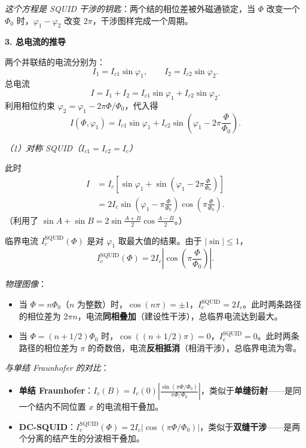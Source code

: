 \begin{insightbox}[举一反三与物理直觉]
\textit{这个方程是 SQUID 干涉的钥匙}：两个结的相位差被外磁通锁定，当 $\Phi$ 改变一个 $\Phi_0$ 时，$\varphi_1 - \varphi_2$ 改变 $2\pi$，干涉图样完成一个周期。

\textbf{3. 总电流的推导}

两个并联结的电流分别为：
\[
I_1 = I_{c1}\sin\varphi_1, \qquad I_2 = I_{c2}\sin\varphi_2.
\]
总电流
\[
I = I_1 + I_2 = I_{c1}\sin\varphi_1 + I_{c2}\sin\varphi_2.
\]
利用相位约束 $\varphi_2 = \varphi_1 - 2\pi\Phi/\Phi_0$，代入得
\[
I(\Phi, \varphi_1) = I_{c1}\sin\varphi_1 + I_{c2}\sin\left(\varphi_1 - 2\pi\frac{\Phi}{\Phi_0}\right).
\]

\textit{（1）对称 SQUID（$I_{c1}=I_{c2}=I_c$）}

此时
\begin{align*}
I &= I_c\left[\sin\varphi_1 + \sin\left(\varphi_1 - 2\pi\frac{\Phi}{\Phi_0}\right)\right] \\
&= 2I_c \sin\left(\varphi_1 - \pi\frac{\Phi}{\Phi_0}\right) \cos\left(\pi\frac{\Phi}{\Phi_0}\right).
\end{align*}
（利用了 $\sin A + \sin B = 2\sin\frac{A+B}{2}\cos\frac{A-B}{2}$。）

临界电流 $I_c^{\text{SQUID}}(\Phi)$ 是对 $\varphi_1$ 取最大值的结果。由于 $|\sin|\le 1$，
\[
\boxed{I_c^{\text{SQUID}}(\Phi) = 2I_c \left|\cos\left(\pi\frac{\Phi}{\Phi_0}\right)\right|}.
\]

\textit{物理图像}：
\begin{itemize}[nosep]
    \item 当 $\Phi = n\Phi_0$（$n$ 为整数）时，$\cos(n\pi)=\pm 1$，$I_c^{\text{SQUID}} = 2I_c$。此时两条路径的相位差为 $2\pi n$，电流\textbf{同相叠加}（建设性干涉），总临界电流达到最大。
    \item 当 $\Phi = (n+1/2)\Phi_0$ 时，$\cos((n+1/2)\pi)=0$，$I_c^{\text{SQUID}} = 0$。此时两条路径的相位差为 $\pi$ 的奇数倍，电流\textbf{反相抵消}（相消干涉），总临界电流为零。
\end{itemize}

\textit{与单结 Fraunhofer 的对比}：
\begin{itemize}[nosep]
    \item \textbf{单结 Fraunhofer}：$I_c(B) = I_c(0)|\frac{\sin(\pi\Phi/\Phi_0)}{\pi\Phi/\Phi_0}|$，类似于\textbf{单缝衍射}——是同一个结内不同位置 $x$ 的电流相干叠加。
    \item \textbf{DC-SQUID}：$I_c^{\text{SQUID}}(\Phi) = 2I_c|\cos(\pi\Phi/\Phi_0)|$，类似于\textbf{双缝干涉}——是两个分离的结产生的分波相干叠加。
\end{itemize}


\end{insightbox}
